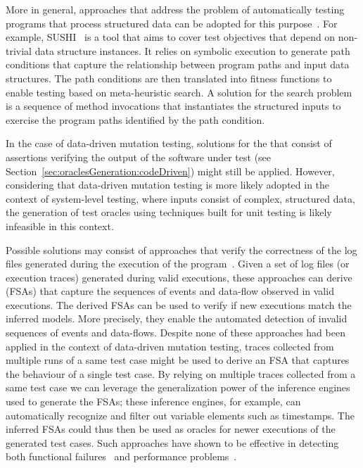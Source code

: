 More in general, approaches that address the problem of automatically testing programs that process structured data can be adopted for this purpose~\cite{Kiran:2008,Braione:2017,Braione:2018}. For example, SUSHI~\cite{Braione:2018} is a tool that aims to cover test objectives that depend on non-trivial data structure instances. 
It relies on symbolic execution to generate path conditions that capture the relationship between program paths and input data structures. The path conditions are then translated into fitness functions to enable testing based on meta-heuristic search. A solution for the search problem is a sequence of method invocations that instantiates the structured inputs to exercise the program paths identified by the path condition. 

\label{sec:oracles:dataMutation}

In the case of data-driven mutation testing, solutions for the  that consist of assertions verifying the output of the software under test (see Section~\ref{sec:oraclesGeneration:codeDriven}) might still be applied. However, considering that data-driven mutation testing is more likely adopted in the context of system-level testing, where inputs consist of complex, structured data, the generation of test oracles using techniques built for unit testing is likely infeasible in this context. 

Possible solutions may consist of approaches that verify the correctness of the log files generated during the execution of the program~\cite{Pastore:ISSRE:08,Pastore:TKT:17}.
Given a set of log files (or execution traces) generated during valid executions, these approaches can derive  (FSAs) that capture the sequences of events and data-flow observed in valid executions. The derived FSAs can be used to verify if new executions match the inferred models. More precisely, they enable the automated detection of invalid sequences of events and data-flows. Despite none of these approaches had been applied in the context of data-driven mutation testing, traces collected from multiple runs of a same test case might be used to derive an FSA that captures the behaviour of a single test case. By relying on multiple traces collected from a same test case we can leverage the generalization power of the inference engines used to generate the FSAs; these inference engines, for example, can automatically recognize and filter out variable elements such as timestamps. The inferred FSAs could thus then be used as oracles for newer executions of the generated test cases. Such approaches have shown to be effective in detecting both functional failures~\cite{Pastore:ISSRE:08} and performance problems~\cite{Pastore:TKT:17}.



